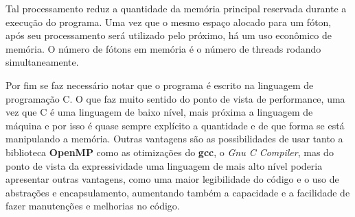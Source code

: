   Tal processamento reduz a quantidade da memória principal reservada durante a execução do programa. Uma vez que o mesmo espaço alocado para um fóton, após seu processamento será utilizado pelo próximo, há um uso econômico de memória. O número de fótons em memória é o número de threads rodando simultaneamente.

  Por fim se faz necessário notar que o programa é escrito na linguagem de programação C. O que faz muito sentido do ponto de vista de performance, uma vez que C é uma linguagem de baixo nível, mais próxima a linguagem de máquina e por isso é quase sempre explícito a quantidade e de que forma se está manipulando a memória. Outras vantagens são as possibilidades de usar tanto a biblioteca \textbf{OpenMP} como as otimizações do \textbf{gcc}, o \textit{Gnu C Compiler}, mas do ponto de vista da expressividade uma linguagem de mais alto nível poderia apresentar outras vantagens, como uma maior legibilidade do código e o uso de abstrações e encapsulamento, aumentando também a capacidade e a facilidade de fazer manutenções e melhorias no código.
